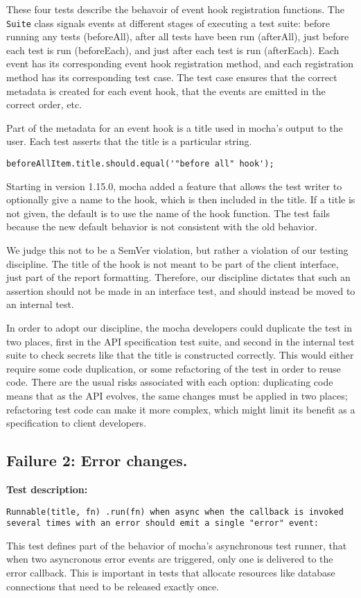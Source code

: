 These four tests describe the behavoir of event hook registration
functions. The {\tt Suite} class signals events at different stages of
executing a test suite: before running any tests (beforeAll), after
all tests have been run (afterAll), just before each test is run
(beforeEach), and just after each test is run (afterEach). Each event
has its corresponding event hook registration method, and each
registration method has its corresponding test case. The test case
ensures that the correct metadata is created for each event hook, that
the events are emitted in the correct order, etc.

Part of the metadata for an event hook is a title used in mocha's
output to the user. Each test asserts that the title is a particular
string.

\begin{verbatim}
beforeAllItem.title.should.equal('"before all" hook');
\end{verbatim}

Starting in version 1.15.0, mocha added a feature that allows the test
writer to optionally give a name to the hook, which is then included
in the title. If a title is not given, the default is to use the name
of the hook function. The test fails because the new default behavior
is not consistent with the old behavior.

We judge this not to be a SemVer violation, but rather a violation of
our testing discipline. The title of the hook is not meant to be part
of the client interface, just part of the report
formatting. Therefore, our discipline dictates that such an assertion
should not be made in an interface test, and should instead be moved
to an internal test.

In order to adopt our discipline, the mocha developers could duplicate
the test in two places, first in the API specification test suite, and
second in the internal test suite to check secrets like that the title
is constructed correctly. This would either require some code
duplication, or some refactoring of the test in order to reuse
code. There are the usual risks associated with each option:
duplicating code means that as the API evolves, the same changes must
be applied in two places; refactoring test code can make it more
complex, which might limit its benefit as a specification to client
developers.

\subsection{Failure 2: Error changes.}
{\bf Test description: }
\begin{verbatim}
Runnable(title, fn) .run(fn) when async when the callback is invoked several times with an error should emit a single "error" event:
\end{verbatim}
This test defines part of the behavior of mocha's asynchronous test
runner, that when two asyncronous error events are triggered, only one
is delivered to the error callback. This is important in tests that
allocate resources like database connections that need to be released
exactly once.


